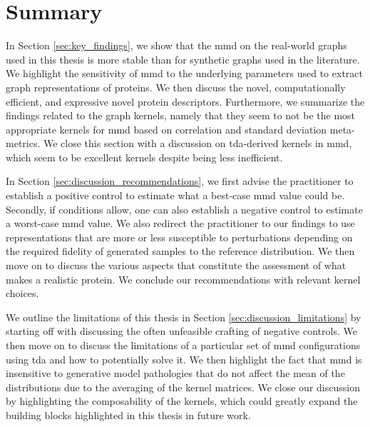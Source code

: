 \section{Summary}


In Section \ref{sec:key_findings}, we show that the \gls{mmd} on the
real-world graphs used in this thesis is more stable than for synthetic graphs
used in the literature. We highlight the sensitivity of \gls{mmd} to the
underlying parameters used to extract graph representations of proteins. We then
discuss the novel, computationally efficient, and expressive novel protein
descriptors. Furthermore, we summarize the findings related to the graph
kernels, namely that they seem to not be the most appropriate kernels for \gls{mmd} based on
correlation and standard deviation meta-metrics. We close this section with a
discussion on \gls{tda}-derived kernels in \gls{mmd}, which seem to be excellent
kernels despite being less inefficient.

In Section \ref{sec:discussion_recommendations}, we first advise the
practitioner to establish a positive control to estimate what a best-case
\gls{mmd} value could be. Secondly, if conditions allow, one can also
establish a negative control to estimate a worst-case \gls{mmd} value. We
also redirect the practitioner to our findings to use representations that are
more or less susceptible to perturbations depending on the required fidelity of
generated samples to the reference distribution. We then move on to discuss the
various aspects that constitute the assessment of what makes a realistic
protein. We conclude our recommendations with relevant kernel choices.

We outline the limitations of this thesis in Section
\ref{sec:discussion_limitations} by starting off with discussing the often
unfeasible crafting of negative controls. We then move on to discuss the
limitations of a particular set of \gls{mmd} configurations using \gls{tda} and how to
potentially solve it. We then highlight the fact that \gls{mmd} is insensitive to
generative model pathologies that do not affect the mean of the distributions
due to the averaging of the kernel matrices. We close our discussion by
highlighting the composability of the kernels, which could greatly expand the
building blocks highlighted in this thesis in future work.
